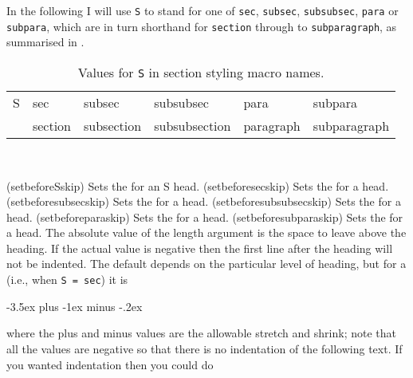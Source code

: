     In the following I will use \texttt{S} to stand for one of \texttt{sec},
\texttt{subsec}, \texttt{subsubsec}, \texttt{para} or \texttt{subpara},
which are in turn shorthand for \texttt{section} through to
\texttt{subparagraph}, as summarised in .

\begin{table}
\centering
\caption{Values for \texttt{S} in section styling macro names.} \label{tab:Sshort}
\ttfamily
\begin{tabular}{llllll}\toprule
S & sec & subsec & subsubsec & para & subpara \\
  & section & subsection & subsubsection & paragraph & subparagraph \\
\bottomrule
\end{tabular}
\end{table}

\begin{syntax}
\cmd{\setbeforeSskip} \\
\end{syntax}
\glossary(setbeforeSskip)%
  {}%
  {Sets the  for an S head.}
\glossary(setbeforesecskip)%
  {}%
  {Sets the  for a  head.}
\glossary(setbeforesubsecskip)%
  {}%
  {Sets the  for a  head.}
\glossary(setbeforesubsubsecskip)%
  {}%
  {Sets the  for a  head.}
\glossary(setbeforeparaskip)%
  {}%
  {Sets the  for a  head.}
\glossary(setbeforesubparaskip)%
  {}%
  {Sets the  for a  head.}
The absolute value of the  length argument is the space to leave
above the heading. If the actual value is negative then the first line
after the heading will not be indented. The default  depends on the
particular level of heading, but for a \cmd{\section}
(i.e., when \verb?S = sec?) it is
\begin{lcode}
-3.5ex plus -1ex minus -.2ex
\end{lcode}
where the plus and minus values are the
allowable stretch and shrink; note that all the values are negative so that
there is no indentation of the following text. If you wanted indentation then
you could do
\begin{lcode}
\end{lcode}


